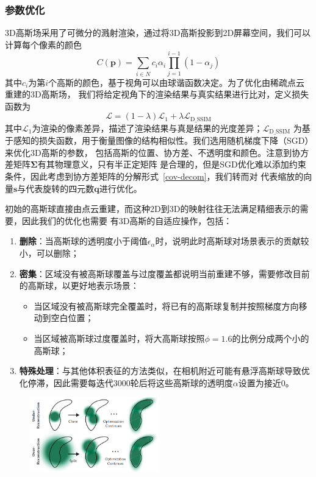 \subsubsection{参数优化}
3D高斯场采用了可微分的溅射渲染，通过将3D高斯投影到2D屏幕空间，我们可以计算每个像素的颜色
\begin{equation}
    C(\symbf{p})=\sum_{i\in N}c_i\alpha_i\prod_{j=1}^{i-1}(1-\alpha_j)
\end{equation}
其中$c_i$为第$i$个高斯的颜色，基于视角可以由球谐函数决定。为了优化由稀疏点云重建的3D高斯场，
我们将给定视角下的渲染结果与真实结果进行比对，定义损失函数为
\begin{equation}
    \mathcal{L}=(1-\lambda)\mathcal{L}_1+\lambda\mathcal{L}_\text{D\_SSIM}
\end{equation}
其中$\mathcal{L}_1$为渲染的像素差异，描述了渲染结果与真是结果的光度差异；$\mathcal{L}_\text{D\_SSIM}$
为基于感知的损失函数，用于衡量图像的结构相似性。我们选用随机梯度下降（SGD）来优化3D高斯的参数，
包括高斯的位置、协方差、不透明度和颜色。注意到协方差矩阵$\symbf{\Sigma}$有其物理意义，只有半正定矩阵
是合理的，但是SGD优化难以添加约束条件，因此考虑到协方差矩阵的分解形式~\eqref{cov-decom}，我们转而对
代表缩放的向量$\symbf{s}$与代表旋转的四元数$\symbf{q}$进行优化。

初始的高斯球直接由点云重建，而这种2D到3D的映射往往无法满足精细表示的需要，因此我们的优化也需要
有3D高斯的自适应操作，包括：
\begin{enumerate}
    \item \textbf{删除}：当高斯球的透明度小于阈值$\epsilon_{\alpha}$时，说明此时高斯球对场景表示的贡献较小，可以删除；
    \item \textbf{密集}：区域没有被高斯球覆盖与过度覆盖都说明当前重建不够，需要修改目前的高斯球，以更好地表示场景：
        \begin{itemize}
            \item 当区域没有被高斯球完全覆盖时，将已有的高斯球复制并按照梯度方向移动到空白位置；
            \item 当区域被高斯球过度覆盖时，将大高斯球按照$\phi=1.6$的比例分成两个小的高斯球；
        \end{itemize}
    \item \textbf{特殊处理}：与其他体积表征的方法类似，在相机附近可能有悬浮高斯球导致优化停滞，因此需要每迭代3000轮后将这些高斯球的透明度$\alpha$设置为接近0。
\end{enumerate}

\begin{figure}[ht]
    \centering
    \includegraphics[width=0.5\textwidth]{source/img/gauss_recon.png}
\end{figure}


